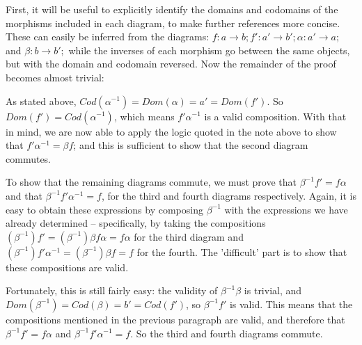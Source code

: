 \documentclass[main.tex]{subfiles}
\begin{document}
First, it will be useful to explicitly identify the domains and codomains of the
morphisms included in each diagram, to make further references more concise.
These can easily be inferred from the diagrams: \(f \colon a \to b; f' \colon a'
\to b'; \alpha \colon a' \to a;\) and \(\beta \colon b \to b';\) while the
inverses of each morphism go between the same objects, but with the domain and
codomain reversed. Now the remainder of the proof becomes almost trivial:

As stated above, \(Cod(\alpha^{-1}) = Dom(\alpha) = a' = Dom (f')\). So
\(Dom(f') = Cod(\alpha^{-1})\), which means \(f' \alpha^{-1}\) is a valid
composition. With that in mind, we are now able to apply the logic quoted in the
note above to show that \(f' \alpha^{-1} = \beta f\); and this is sufficient to
show that the second diagram commutes.

To show that the remaining diagrams commute, we must prove that \(\beta^{-1} f'
= f \alpha\) and that \(\beta^{-1} f' \alpha^{-1} = f\), for the third and
fourth diagrams respectively. Again, it is easy to obtain these expressions by
composing \(\beta^{-1}\) with the expressions we have already determined --
specifically, by taking the compositions \((\beta^{-1})f' = (\beta^{-1})\beta f
\alpha = f \alpha\) for the third diagram and \((\beta^{-1})f' \alpha^{-1} =
(\beta^{-1})\beta f = f\) for the fourth. The 'difficult' part is to show that
these compositions are valid.

Fortunately, this is still fairly easy: the validity of \(\beta^{-1} \beta\) is
trivial, and \(Dom(\beta^{-1}) = Cod(\beta) = b' = Cod(f')\), so \(\beta^{-1}
f'\) is valid. This means that the compositions mentioned in the previous
paragraph are valid, and therefore that \(\beta^{-1} f' = f \alpha\) and
\(\beta^{-1} f' \alpha^{-1} = f\). So the third and fourth diagrams commute.
\end{document}
